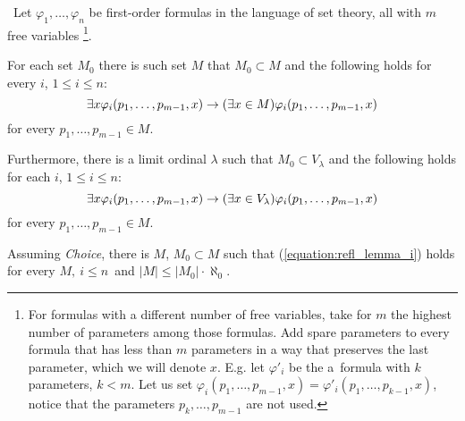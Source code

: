 
\begin{lemma}\label{lemma:reflection_lemma}\
Let $\varphi_1, \ldots, \varphi_n$ be first-order formulas in the language of set theory, all with $m$ free variables
\footnote{For formulas with a different number of free variables, take for $m$ the highest number of parameters among those formulas. Add spare parameters to every formula that has less than $m$ parameters in a way that preserves the last parameter, which we will denote $x$.
E.g. let $\varphi'_i$ be the a~formula with $k$ parameters, $k < m$. Let us set $\varphi_i(p_1, \ldots, p_{m-1}, x) = \varphi'_i(p_1, \ldots, p_{k-1}, x)$, notice that the parameters $p_k, \ldots, p_{m-1}$ are not used.}.
\bce[(i)]
\item For each set $M_0$ there is such set $M$ that $M_0 \subset M$ and the following holds for every $i$, $1 \leq i \leq n$:
\begin{equation}\label{equation:refl_lemma_i}
\exists x \varphi_i(p_1, \ldots, p_{m-1}, x) \rightarrow (\exists x \in M) \varphi_i(p_1, \ldots, p_{m-1}, x)
\end{equation}
for every $p_1, \ldots, p_{m-1} \in M$.

\item Furthermore, there is a limit ordinal $\lambda$ such that $M_0 \subset V_\lambda$ and the following holds for each $i$, $1 \leq i \leq n$:
\begin{equation}\label{equation:refl_lemma_ii}
\exists x \varphi_i(p_1, \ldots, p_{m-1}, x) \rightarrow (\exists x \in V_\lambda) \varphi_i(p_1, \ldots, p_{m-1}, x)
\end{equation}
for every $p_1, \ldots, p_{m-1} \in M$.

\item Assuming \emph{Choice}, there is $M$, $M_0 \subset M$ such that (\ref{equation:refl_lemma_i}) holds for every $M,\ i \leq n$ and $|M| \leq |M_0| \cdot \aleph_0$.
\ece
\end{lemma}

